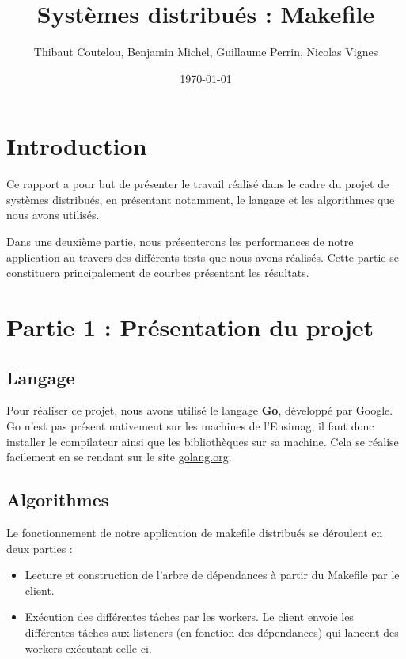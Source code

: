 \documentclass[a4paper,11pt]{article}
\title{Systèmes distribués : Makefile}
\author{Thibaut Coutelou, Benjamin Michel, Guillaume Perrin, Nicolas Vignes}
\date{\today}
\begin{document}
\maketitle

\setlength{\parskip}{2mm}

\section{Introduction}
Ce rapport a pour but de présenter le travail réalisé dans le cadre du projet
de systèmes distribués, en présentant notamment, le langage et les algorithmes
que nous avons utilisés.

Dans une deuxième partie, nous présenterons les performances de notre
application au travers des différents tests que nous avons réalisés. Cette
partie se constituera principalement de courbes présentant les résultats.

\section{Partie 1 : Présentation du projet}
\subsection{Langage}
Pour réaliser ce projet, nous avons utilisé le langage \textbf{Go}, développé
par Google. Go n'est pas présent nativement sur les machines de l'Ensimag, il
faut donc installer le compilateur ainsi que les bibliothèques sur sa machine.
Cela se réalise facilement en se rendant sur le site
\href{http://golang.org/doc/install#download}{golang.org}.

\subsection{Algorithmes}
Le fonctionnement de notre application de makefile distribués se déroulent en deux parties :
\begin{itemize}
\item Lecture et construction de l'arbre de dépendances à partir du Makefile
    par le client.
\item Exécution des différentes tâches par les workers. Le client envoie les
    différentes tâches aux listeners (en fonction des dépendances) qui lancent
    des workers exécutant celle-ci.
\end{itemize}
\end{document}
